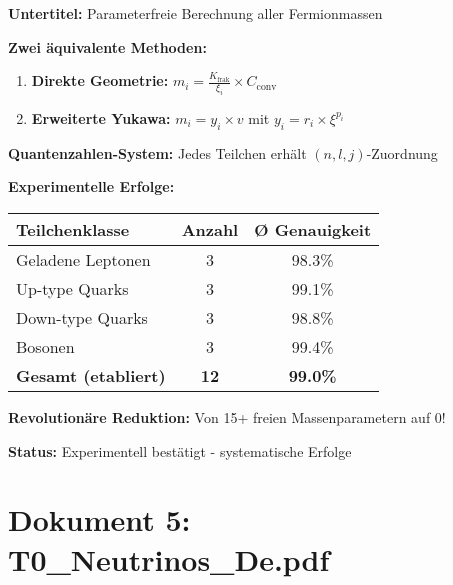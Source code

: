 \documentclass[12pt,a4paper]{article}
\newcommand{\xipar}{\xi}
\begin{document}
	\begin{documentbox}
		\textbf{Untertitel:} Parameterfreie Berechnung aller Fermionmassen
		
		\textbf{Zwei äquivalente Methoden:}
		\begin{enumerate}
			\item \textbf{Direkte Geometrie:} $m_i = \frac{K_{\text{frak}}}{\xi_i} \times C_{\text{conv}}$
			\item \textbf{Erweiterte Yukawa:} $m_i = y_i \times v$ mit $y_i = r_i \times \xipar^{p_i}$
		\end{enumerate}
		
		\textbf{Quantenzahlen-System:} Jedes Teilchen erhält $(n,l,j)$-Zuordnung
		
		\textbf{Experimentelle Erfolge:}
		\begin{center}
			\begin{tabular}{lcc}
				\toprule
				\textbf{Teilchenklasse} & \textbf{Anzahl} & \textbf{Ø Genauigkeit} \\
				\midrule
				Geladene Leptonen & 3 & 98.3\% \\
				Up-type Quarks & 3 & 99.1\% \\
				Down-type Quarks & 3 & 98.8\% \\
				Bosonen & 3 & 99.4\% \\
				\midrule
				\textbf{Gesamt (etabliert)} & \textbf{12} & \textbf{99.0\%} \\
				\bottomrule
			\end{tabular}
		\end{center}
		
		\textbf{Revolutionäre Reduktion:} Von 15+ freien Massenparametern auf 0!
		
		\textbf{Status:} Experimentell bestätigt - systematische Erfolge
	\end{documentbox}
	
	\section{Dokument 5: T0\_Neutrinos\_De.pdf}
	
\end{document}
